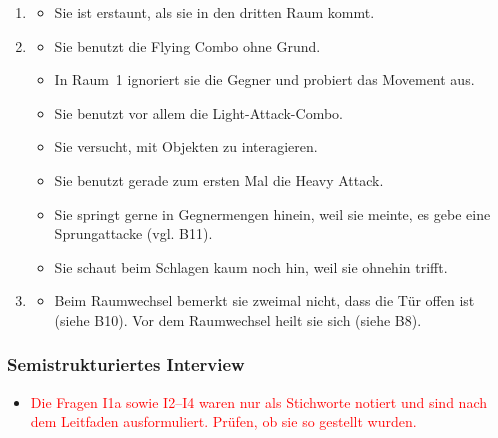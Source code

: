 \documentclass[../Main.tex]{subfiles}
\begin{document}
\begin{enumerate}[label=\textbf{B\arabic*}, leftmargin=1.5cm, itemsep=0.8em, resume]
\begin{itemize}[nosep]
\item Sie findet die Ästhetik schön.
\item Sie wünscht sich einen Block.
\item Sie findet das Movement richtig cool und meint, es habe eine Lernkurve.
\item Sie findet die Animationen des Heavy Soldiers und des Chain Archers cool.
\end{itemize}
\item
\begin{itemize}[nosep]
\item Sie ist erstaunt, als sie in den dritten Raum kommt.
\end{itemize}
\item
\begin{itemize}[nosep]
\item Sie benutzt die Flying Combo ohne Grund.
\item In Raum~1 ignoriert sie die Gegner und probiert das Movement aus.
\item Sie benutzt vor allem die Light-Attack-Combo.
\item Sie versucht, mit Objekten zu interagieren.
\item Sie benutzt gerade zum ersten Mal die Heavy Attack.
\item Sie springt gerne in Gegnermengen hinein, weil sie meinte, es gebe eine Sprungattacke (vgl. B11).
\item Sie schaut beim Schlagen kaum noch hin, weil sie ohnehin trifft.
\end{itemize}
\item
\begin{itemize}[nosep]
\item Beim Raumwechsel bemerkt sie zweimal nicht, dass die Tür offen ist (siehe B10). Vor dem Raumwechsel heilt sie sich (siehe B8).
\end{itemize}
\end{enumerate}

\subsubsection{Semistrukturiertes Interview}

\begin{itemize}[leftmargin=1.5cm]
\item \textcolor{red}{Die Fragen I1a sowie I2--I4 waren nur als Stichworte notiert und sind nach dem Leitfaden ausformuliert. Prüfen, ob sie so gestellt wurden.}
\end{itemize}
\end{document}
